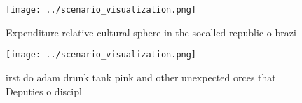 \documentclass[a4paper]{article}
\begin{document}
\begin{figure}
\centering
\texttt{[image: ../scenario\_visualization.png]}
\caption{Expenditure relative cultural sphere in the socalled republic o brazi
}
\end{figure}
 
\begin{figure}
\centering
\texttt{[image: ../scenario\_visualization.png]}
\caption{irst do adam drunk tank pink and other unexpected orces that Deputies o discipl
}
\end{figure}
 
\end{document}
